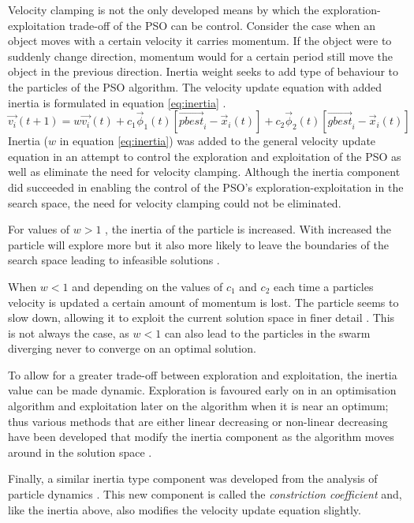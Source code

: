 Velocity clamping is not the only developed means by which  the exploration-exploitation trade-off of the \gls{PSO} can be control. Consider the case when an object moves with a certain velocity it carries momentum. If the object were to suddenly change direction, momentum would for a certain period still move the object in the previous direction. Inertia weight seeks to add type of behaviour to the particles of the \gls{PSO} algorithm. The velocity update equation with added inertia is formulated in equation \ref{eq:inertia} \cite{FundamentalSwarm}.
\begin{equation}
\vec{v_i}(t+1) = w\vec{v_i}(t) + c_1\vec{\phi}_1(t)[\vec{pbest}_i - \vec{x}_i(t)] + c_2\vec{\phi}_2(t)[\vec{gbest}_i - \vec{x}_i(t)]\label{eq:inertia}
\end{equation}
Inertia ($w$ in equation \ref{eq:inertia}) was added to the general velocity update equation in an attempt to control the exploration and exploitation of the \gls{PSO} as well as eliminate the need for velocity clamping\cite{FundamentalSwarm}. Although the inertia component did succeeded in enabling the control of the \gls{PSO}'s exploration-exploitation in the search space, the need for velocity clamping could not be eliminated\cite{FundamentalSwarm}.

For values of $w > 1$ , the inertia of the particle is increased. With increased the particle will explore more but it also more likely to leave the boundaries of the search space leading to infeasible solutions \cite{FundamentalSwarm}. 

When $w < 1$ and depending on the values of $c_1$ and $c_2$ each time a particles velocity is updated a certain amount of momentum is lost. The particle seems to slow down, allowing it to exploit the current solution space in finer detail \cite{FundamentalSwarm}. This is not always the case, as $w < 1$ can also lead to the particles in the swarm diverging never to converge on an optimal solution.

To allow for a greater trade-off between exploration and exploitation, the inertia value can be made dynamic. Exploration is favoured early on in an optimisation algorithm and  exploitation later on the algorithm when it is near an optimum; thus various methods that are either linear decreasing or non-linear decreasing have been developed that modify the inertia component as the algorithm moves around in the solution space \cite{CompuIntelligenceIntro,FundamentalSwarm}.

Finally, a similar inertia type component was developed from the analysis of particle dynamics \cite{FundamentalSwarm}. This new component is called the \emph{constriction coefficient} and, like the inertia above, also modifies the velocity update equation slightly\cite{adaptPSO,FundamentalSwarm,CompuIntelligenceIntro}. 

